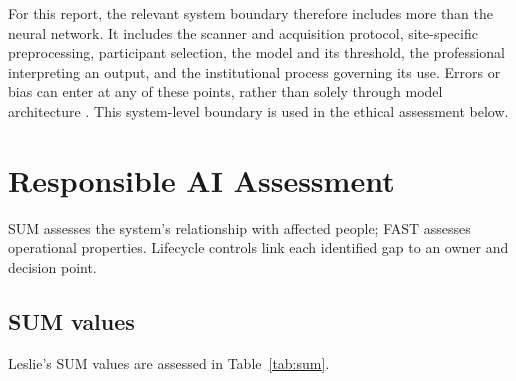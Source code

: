 \documentclass[11pt,a4paper]{article}
\let\cite\parencite
\begin{document}
For this report, the relevant system boundary therefore includes more than the neural network. It includes the scanner and acquisition protocol, site-specific preprocessing, participant selection, the model and its threshold, the professional interpreting an output, and the institutional process governing its use. Errors or bias can enter at any of these points, rather than solely through model architecture \cite{suresh2021}. This system-level boundary is used in the ethical assessment below.

\section{Responsible AI Assessment}
SUM assesses the system's relationship with affected people; FAST assesses operational properties. Lifecycle controls link each identified gap to an owner and decision point.

\subsection{SUM values}
Leslie's SUM values are assessed in Table~\ref{tab:sum}.
\end{document}
